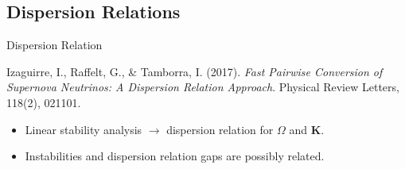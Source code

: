 


\subsection{Dispersion Relations}


\begin{frame}{ Dispersion Relation }

    \begin{tcolorbox}[standard jigsaw,opacityback=0]
        \color{white}
        Izaguirre, I., Raffelt, G., \& Tamborra, I. (2017). \emph{Fast Pairwise Conversion of Supernova Neutrinos: A Dispersion Relation Approach}. Physical Review Letters, 118(2), 021101.
    \end{tcolorbox}


    \begin{itemize}[<+->]
        \item Linear stability analysis $\rightarrow$ dispersion relation for $\Omega$ and $\mathbf K$.
        \item Instabilities and dispersion relation gaps are possibly related.
    \end{itemize}

    \end{frame}


